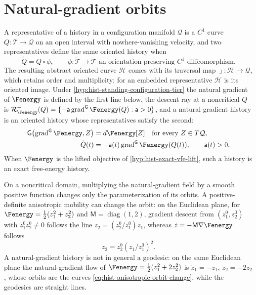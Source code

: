 \section{Natural-gradient orbits}
\label{sec:hist-natural-gradient-oriented-orbit}

A representative of a history in a configuration manifold $\mathcal Q$ is a $C^1$ curve
$Q:\mathcal T\to\mathcal Q$ on an open interval with nowhere-vanishing velocity, and two
representatives define the same oriented history when
\begin{equation}
\widetilde Q=Q\circ\phi,
\qquad
\phi:\widetilde{\mathcal T}\longrightarrow\mathcal T
\text{ an orientation-preserving $C^1$ diffeomorphism}.
\label{eq:hist-oriented-reparameterization-equivalence}
\end{equation}
The resulting abstract oriented curve $\mathscr H$ comes with its traversal map
$\jmath:\mathscr H\to\mathcal Q$, which retains order and multiplicity; for an embedded
representative $\mathscr H$ is its oriented image.  Under
\cref{hyp:hist-standing-configuration-tier} the natural gradient of $\Fenergy$ is defined
by the first line below, the descent ray at a noncritical $Q$ is
$\mathcal R^-_{\Fenergy}(Q)=\{-\mathsf a\operatorname{grad}^{\mathsf G}\Fenergy(Q):\mathsf
a>0\}$, and a natural-gradient history is an oriented history whose representatives
satisfy the second:
\begin{align}
\mathsf G\bigl(\operatorname{grad}^{\mathsf G}\Fenergy,Z\bigr)
&=d\Fenergy[Z]
\quad\text{for every }Z\in T\mathcal Q,
\label{eq:hist-fisher-gradient-definition}\\
\dot Q(t)
&=-\mathsf a(t)\operatorname{grad}^{\mathsf G}\Fenergy(Q(t)),
\qquad \mathsf a(t)>0 .
\label{eq:hist-vfe-ray-representative}
\end{align}
When $\Fenergy$ is the lifted objective of \cref{hyp:hist-exact-vfe-lift}, such a history
is an exact free-energy history.

On a noncritical domain, multiplying the natural-gradient field by a smooth positive
function changes only the parameterization of its orbits.  A positive-definite
anisotropic mobility can change the orbit: on the Euclidean plane, for
$\Fenergy=\tfrac12(z_1^2+z_2^2)$ and $\mathsf M=\operatorname{diag}(1,2)$, gradient
descent from $(z_1^0,z_2^0)$ with $z_1^0z_2^0\ne0$ follows the line $z_2=(z_2^0/z_1^0)z_1$, whereas
$\dot z=-\mathsf M\nabla\Fenergy$ follows
\begin{equation}
z_2=z_2^0\left(z_1/z_1^0\right)^2 .
\label{eq:hist-anisotropic-orbit-change}
\end{equation}
A natural-gradient history is not in general a geodesic: on the same Euclidean plane the
natural-gradient flow of $\Fenergy=\tfrac12(z_1^2+2z_2^2)$ is $\dot z_1=-z_1$,
$\dot z_2=-2z_2$, whose orbits are the curves \eqref{eq:hist-anisotropic-orbit-change},
while the geodesics are straight lines.  

